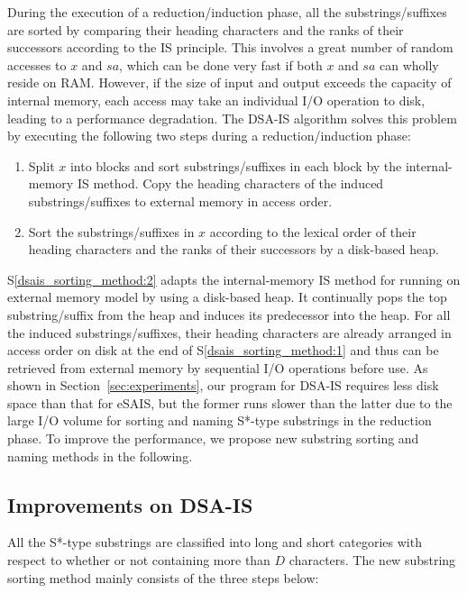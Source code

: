 \documentclass[10pt,journal,compsoc]{IEEEtran}
\begin{document}
During the execution of a reduction/induction phase, all the substrings/suffixes are sorted by comparing their heading characters and the ranks of their successors according to the IS principle. This involves a great number of random accesses to $x$ and $sa$, which can be done very fast if both $x$ and $sa$ can wholly reside on RAM. However, if the size of input and output exceeds the capacity of internal memory, each access may take an individual I/O operation to disk, leading to a performance degradation. The DSA-IS algorithm solves this problem by executing the following two steps during a reduction/induction phase:

\begin{enumerate}[S1]
	
	\item Split $x$ into blocks and sort substrings/suffixes in each block by the internal-memory IS method. Copy the heading characters of the induced substrings/suffixes to external memory in access order. \label{dsais_sorting_method:1}
	
	\item Sort the substrings/suffixes in $x$ according to the lexical order of their heading characters and the ranks of their successors by a disk-based heap. \label{dsais_sorting_method:2}
\end{enumerate}

S\ref{dsais_sorting_method:2} adapts the internal-memory IS method for running on external memory model by using a disk-based heap. It continually pops the top substring/suffix from the heap and induces its predecessor into the heap. For all the induced substrings/suffixes, their heading characters are already arranged in access order on disk at the end of S\ref{dsais_sorting_method:1} and thus can be retrieved from external memory by sequential I/O operations before use. As shown in Section~\ref{sec:experiments}, our program for DSA-IS requires less disk space than that for eSAIS, but the former runs slower than the latter due to the large I/O volume for sorting and naming S*-type substrings in the reduction phase. To improve the performance, we propose new substring sorting and naming methods in the following.

\subsection{Improvements on DSA-IS}

All the S*-type substrings are classified into long and short categories with respect to whether or not containing more than $D$ characters. The new substring sorting method mainly consists of the three steps below:
\end{document}
